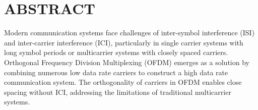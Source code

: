 \section*{ABSTRACT}





Modern communication systems face challenges of inter-symbol interference (ISI) and inter-carrier interference (ICI), particularly in single carrier systems with long symbol periods or multicarrier systems with closely spaced carriers. Orthogonal Frequency Division Multiplexing (OFDM) emerges as a solution by combining numerous low data rate carriers to construct a high data rate communication system. The orthogonality of carriers in OFDM enables close spacing without ICI, addressing the limitations of traditional multicarrier systems.


